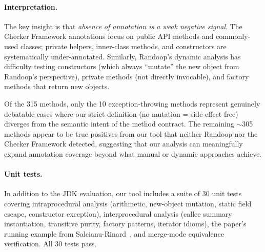 \paragraph{Interpretation.}
The key insight is that \emph{absence of annotation is a weak negative signal}.
The Checker Framework annotations focus on public API methods and commonly-used classes; private helpers, inner-class methods, and constructors are systematically under-annotated.
Similarly, Randoop's dynamic analysis has difficulty testing constructors (which always ``mutate'' the new object from Randoop's perspective), private methods (not directly invocable), and factory methods that return new objects.

Of the 315 methods, only the 10 exception-throwing methods represent genuinely debatable cases where our strict definition (no mutation = side-effect-free) diverges from the semantic intent of the method contract.
The remaining $\sim$305 methods appear to be true positives from our tool that neither Randoop nor the Checker Framework detected, suggesting that our analysis can meaningfully expand annotation coverage beyond what manual or dynamic approaches achieve.


\paragraph{Unit tests.}
In addition to the JDK evaluation, our tool includes a suite of 30 unit tests covering intraprocedural analysis (arithmetic, new-object mutation, static field escape, constructor exception), interprocedural analysis (callee summary instantiation, transitive purity, factory patterns, iterator idioms), the paper's running example from Salcianu-Rinard~\cite{salcianu2005purity}, and merge-mode equivalence verification.
All 30 tests pass.



